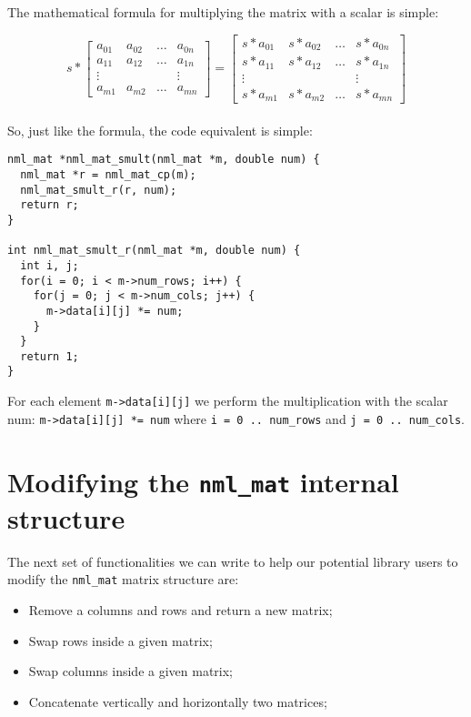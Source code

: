 The mathematical formula for multiplying the matrix with a scalar is simple:

$$
s * \left[
\begin{array}{cccc}
a_{01} & a_{02} & \ldots & a_{0n} \\
a_{11} & a_{12} & \ldots & a_{1n} \\
\vdots & & & \vdots \\
a_{m1} & a_{m2} & \ldots & a_{mn} 
\end{array}
\right]
=
\left[
\begin{array}{cccc}
s * a_{01} & s * a_{02} & \ldots & s * a_{0n} \\
s * a_{11} & s * a_{12} & \ldots & s * a_{1n} \\
\vdots & & & \vdots \\
s * a_{m1} & s * a_{m2} & \ldots & s * a_{mn} 
\end{array}
\right]
$$
\\
So, just like the formula, the code equivalent is simple:

\begin{verbatim}
nml_mat *nml_mat_smult(nml_mat *m, double num) {
  nml_mat *r = nml_mat_cp(m);
  nml_mat_smult_r(r, num);
  return r;
}

int nml_mat_smult_r(nml_mat *m, double num) {
  int i, j;
  for(i = 0; i < m->num_rows; i++) {
    for(j = 0; j < m->num_cols; j++) {
      m->data[i][j] *= num;
    }
  }
  return 1;
} 
\end{verbatim}

For each element {\tt m->data[i][j]} we perform the multiplication with the scalar num: {\tt m->data[i][j] *= num} where {\tt i = 0 .. num\_rows} and {\tt j = 0 .. num\_cols}.

\section{Modifying the {\tt nml\_mat} internal structure}

The next set of functionalities we can write to help our potential library users to modify the {\tt nml\_mat} matrix structure are:

\begin{itemize}
\item Remove a columns and rows and return a new matrix;
\item Swap rows inside a given matrix;
\item Swap columns inside a given matrix;
\item Concatenate vertically and horizontally two matrices;
\end{itemize}

